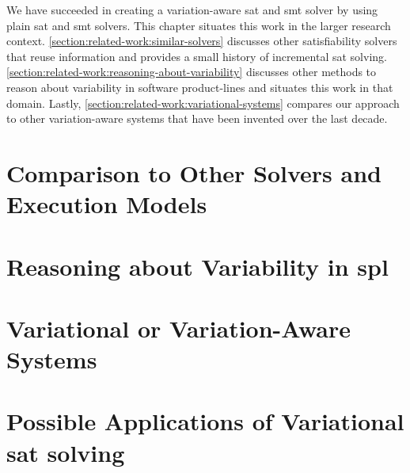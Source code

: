 \label{chapter:related-work}
%
We have succeeded in creating a variation-aware \ac{sat} and \ac{smt} solver by
using plain \ac{sat} and \ac{smt} solvers. This chapter situates this work in
the larger research context. \autoref{section:related-work:similar-solvers}
discusses other satisfiability solvers that reuse information and provides a
small history of incremental \ac{sat} solving.
\autoref{section:related-work:reasoning-about-variability} discusses other
methods to reason about variability in software product-lines and situates this
work in that domain. Lastly, \autoref{section:related-work:variational-systems}
compares our approach to other variation-aware systems that have been invented
over the last decade.
%
\section{Comparison to Other Solvers and Execution Models}

%
\section{Reasoning about Variability in \ac{spl}}

%
\section{Variational or Variation-Aware Systems}

%
\section{Possible Applications of Variational \acs{sat} solving}


